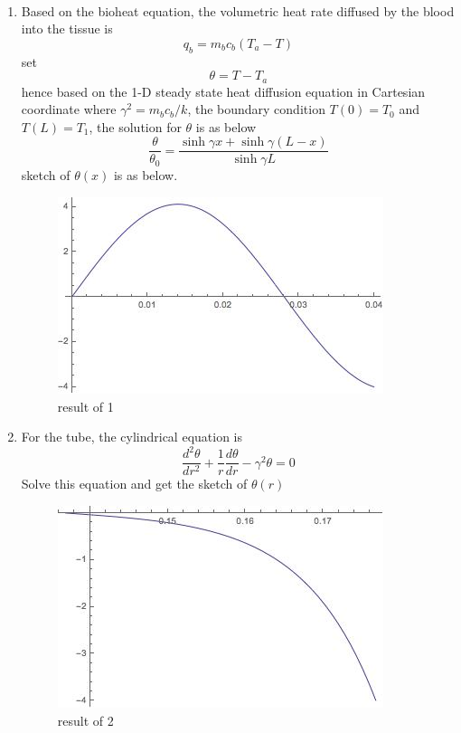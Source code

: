 \begin{solution}
~
\begin{enumerate}
\item
Based on the bioheat equation, the volumetric heat rate diffused by the blood into the tissue is 
$$q_b=m_b c_b(T_a-T)$$
set$$\theta = T-T_a$$
hence based on the 1-D steady state heat diffusion equation in Cartesian coordinate
where $\gamma^2=m_b c_b/k$, the boundary condition $T(0)=T_0$ and  $T(L)=T_1$,
the solution for $\theta$ is as below
$$\frac{\theta}{\theta_0}=\frac{\sinh\gamma x+\sinh\gamma(L-x)}{\sinh\gamma L}$$
sketch of $\theta(x)$ is as below.
\begin{figure}[h!]
  \centering
    \includegraphics[scale=0.6]{figures/ch2/10}
    \caption{result of 1}
    \label{fig:2:10}
\end{figure}
\item
For the tube, the cylindrical equation is
$$\frac{d^2 \theta}{dr^2} + \frac{1}{r}\frac{d\theta}{dr}-\gamma^2\theta=0$$
Solve this equation and get the sketch of $\theta(r)$
\begin{figure}[h!]
  \centering
    \includegraphics[scale=0.8]{figures/ch2/11}
    \caption{result of 2}
    \label{fig:2:11}
\end{figure}
\end{enumerate}
\end{solution}

